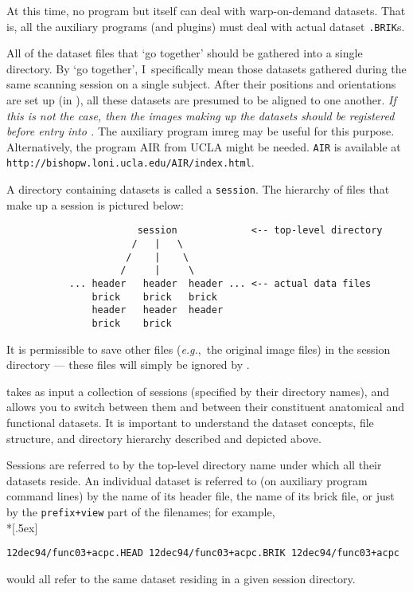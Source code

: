At this time, no program but \afnit itself can deal with warp-on-demand
datasets.  That is, all the auxiliary programs (and plugins) must
deal with actual dataset {\tt .BRIK}s.

All
of the dataset files that `go together' should be gathered into
a single directory.
By `go together', I~specifically mean those datasets gathered during the same
scanning session on a single subject.  After their positions and orientations
are set up (in \tothreed), all these datasets are presumed to be aligned to
one another.  {\it If this is not the case, then the images making up the
datasets should be registered before entry into \tothreed.}
The auxiliary program {\sf imreg} may be useful for this purpose.
Alternatively, the program {\sf AIR} from UCLA might be needed.  {\tt AIR}
is available at {\verb=http://bishopw.loni.ucla.edu/AIR/index.html=}.

\vspace{1in}\goodbreak\vspace{-1in}
A directory containing datasets is called a {\tt session}.
The hierarchy of files that make up a session
is pictured below:
\begin{samepage}\begin{verbatim}
                       session             <-- top-level directory
                      /   |   \
                     /    |    \
                    /     |     \
           ... header   header  header ... <-- actual data files
               brick    brick   brick
               header   header  header
               brick    brick
\end{verbatim}\end{samepage}

It is permissible to save other files ({\it e.g.},~the original image files)
in the session directory --- these files will simply be ignored by \afni.

\afnit takes as input a collection of sessions (specified by their directory
names), and allows you to switch
between them and between their constituent anatomical and functional datasets.
It is important to understand the dataset concepts,
file structure, and directory hierarchy described and depicted above.

Sessions
are referred to
by the top-level directory name under which
all their datasets reside.  An individual dataset is referred to (on auxiliary
program command lines) by
the name of its header file, the name of its brick file, or just
by the {\tt prefix+view} part of the filenames; for example,\\*[.5ex]
\centerline{\tt 12dec94/func03+acpc.HEAD \blob
                12dec94/func03+acpc.BRIK \blob 12dec94/func03+acpc}\vspace{.5ex}
would all refer to the same dataset residing in a given session
directory.

